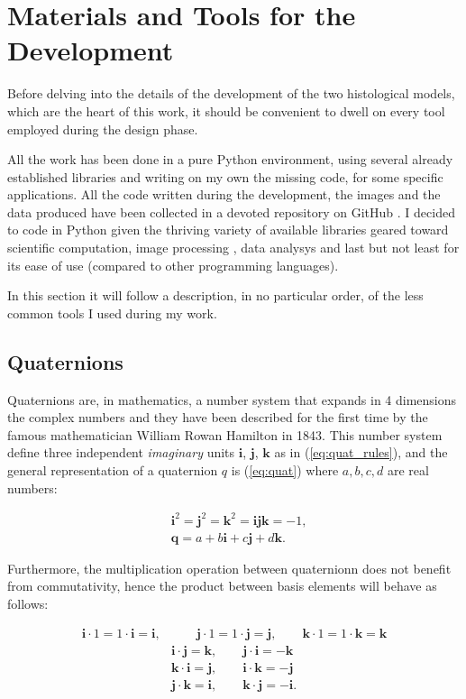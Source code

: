 \section{Materials and Tools for the Development}
Before delving into the details of the development of the two histological models, which are the heart of this work, it should be convenient to dwell on every tool employed during the design phase.

All the work has been done in a pure Python environment, using several already established libraries and writing on my own the missing code, for some specific applications. All the code written during the development, the images and the data produced have been collected in a devoted repository on GitHub \cite{repo}. I decided to code in Python given the thriving variety of available libraries geared toward scientific computation, image processing , data analysys and last but not least for its ease of use (compared to other programming languages).

In this section it will follow a description, in no particular order, of the less common tools I used during my work.

\subsection{Quaternions}
Quaternions are, in mathematics, a number system that expands in 4 dimensions the complex numbers and they have been described for the first time by the famous mathematician William Rowan Hamilton in 1843. This number system define three independent \textit{imaginary} units $\bm{i}$, $\bm{j}$, $\bm{k}$ as in (\ref{eq:quat_rules}), and the general representation of a quaternion $q$ is (\ref{eq:quat}) where $a,b,c,d$ are real numbers:

\begin{align}
    & \bm{i}^2 = \bm{j}^2 = \bm{k}^2 = \bm{i}\bm{j}\bm{k} = -1, \label{eq:quat_rules}\\
    & \bm{q} = a + b\bm{i} + c\bm{j} + d\bm{k}. \label{eq:quat}
\end{align}

Furthermore, the multiplication operation between quaternionn does not benefit from commutativity, hence the product between basis elements will behave as follows:

\begin{align}
    \bm{i} \cdot 1 = 1 \cdot \bm{i} = \bm{i}, & \qquad  \bm{j} \cdot 1 = 1 \cdot \bm{j} = \bm{j}, \qquad \bm{k} \cdot 1 = 1 \cdot \bm{k} = \bm{k} \\
    & \bm{i} \cdot \bm{j}= \bm{k}, \qquad \bm{j} \cdot \bm{i}= -\bm{k} \nonumber \\
    & \bm{k} \cdot \bm{i}= \bm{j}, \qquad \bm{i} \cdot \bm{k}= -\bm{j} \nonumber \\
    & \bm{j} \cdot \bm{k}= \bm{i}, \qquad \bm{k} \cdot \bm{j}= -\bm{i}. \nonumber
\end{align}

